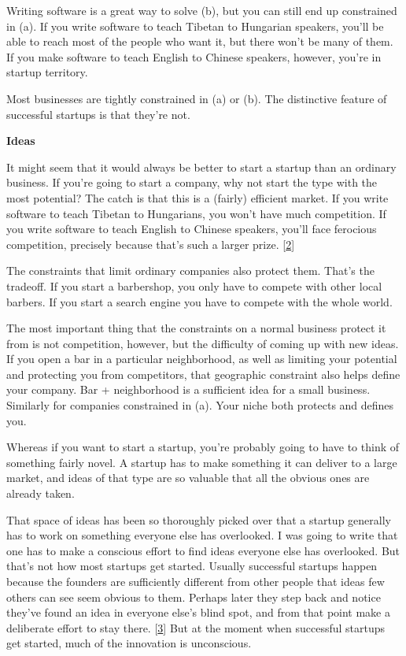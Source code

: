Writing software is a great way to solve (b), but you can still end up
constrained in (a). If you write software to teach Tibetan to Hungarian
speakers, you'll be able to reach most of the people who want it, but
there won't be many of them. If you make software to teach English to
Chinese speakers, however, you're in startup territory.

Most businesses are tightly constrained in (a) or (b). The distinctive
feature of successful startups is that they're not.

\textbf{Ideas}

It might seem that it would always be better to start a startup than an
ordinary business. If you're going to start a company, why not start the
type with the most potential? The catch is that this is a (fairly)
efficient market. If you write software to teach Tibetan to Hungarians,
you won't have much competition. If you write software to teach English
to Chinese speakers, you'll face ferocious competition, precisely
because that's such a larger prize. {[}\hyperref[f2n]{2}{]}

The constraints that limit ordinary companies also protect them. That's
the tradeoff. If you start a barbershop, you only have to compete with
other local barbers. If you start a search engine you have to compete
with the whole world.

The most important thing that the constraints on a normal business
protect it from is not competition, however, but the difficulty of
coming up with new ideas. If you open a bar in a particular
neighborhood, as well as limiting your potential and protecting you from
competitors, that geographic constraint also helps define your company.
Bar + neighborhood is a sufficient idea for a small business. Similarly
for companies constrained in (a). Your niche both protects and defines
you.

Whereas if you want to start a startup, you're probably going to have to
think of something fairly novel. A startup has to make something it can
deliver to a large market, and ideas of that type are so valuable that
all the obvious ones are already taken.

That space of ideas has been so thoroughly picked over that a startup
generally has to work on something everyone else has overlooked. I was
going to write that one has to make a conscious effort to find ideas
everyone else has overlooked. But that's not how most startups get
started. Usually successful startups happen because the founders are
sufficiently different from other people that ideas few others can see
seem obvious to them. Perhaps later they step back and notice they've
found an idea in everyone else's blind spot, and from that point make a
deliberate effort to stay there. {[}\hyperref[f3n]{3}{]} But at the
moment when successful startups get started, much of the innovation is
unconscious.

